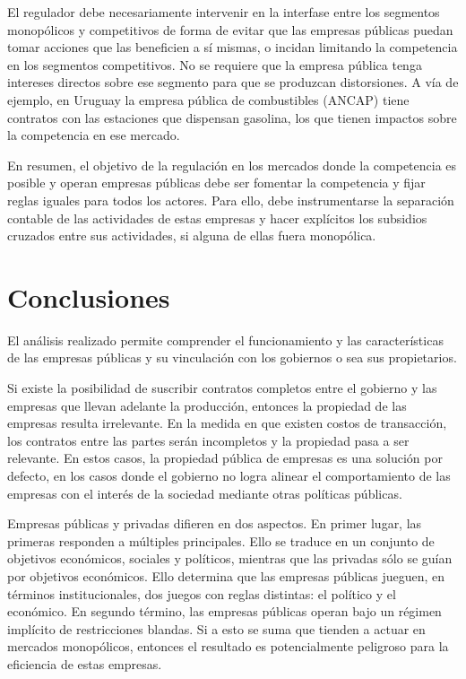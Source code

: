 \documentclass[
  12pt,
  spanish,
]{book}
\begin{document}
El regulador debe necesariamente intervenir en la interfase entre los segmentos monopólicos y competitivos de forma de evitar que las empresas públicas puedan tomar acciones que las beneficien a sí mismas, o incidan limitando la competencia en los segmentos competitivos. No se requiere que la empresa pública tenga intereses directos sobre ese segmento para que se produzcan distorsiones. A vía de ejemplo, en Uruguay la empresa pública de combustibles (ANCAP) tiene contratos con las estaciones que dispensan gasolina, los que tienen impactos sobre la competencia en ese mercado.

En resumen, el objetivo de la regulación en los mercados donde la competencia es posible y operan empresas públicas debe ser fomentar la competencia y fijar reglas iguales para todos los actores. Para ello, debe instrumentarse la separación contable de las actividades de estas empresas y hacer explícitos los subsidios cruzados entre sus actividades, si alguna de ellas fuera monopólica.

\hypertarget{conclusiones-2}{%
\section{Conclusiones}\label{conclusiones-2}}

El análisis realizado permite comprender el funcionamiento y las características de las empresas públicas y su vinculación con los gobiernos o sea sus propietarios.

Si existe la posibilidad de suscribir contratos completos entre el gobierno y las empresas que llevan adelante la producción, entonces la propiedad de las empresas resulta irrelevante. En la medida en que existen costos de transacción, los contratos entre las partes serán incompletos y la propiedad pasa a ser relevante. En estos casos, la propiedad pública de empresas es una solución por defecto, en los casos donde el gobierno no logra alinear el comportamiento de las empresas con el interés de la sociedad mediante otras políticas públicas.

Empresas públicas y privadas difieren en dos aspectos. En primer lugar, las primeras responden a múltiples principales. Ello se traduce en un conjunto de objetivos económicos, sociales y políticos, mientras que las privadas sólo se guían por objetivos económicos. Ello determina que las empresas públicas jueguen, en términos institucionales, dos juegos con reglas distintas: el político y el económico. En segundo término, las empresas públicas operan bajo un régimen implícito de restricciones blandas. Si a esto se suma que tienden a actuar en mercados monopólicos, entonces el resultado es potencialmente peligroso para la eficiencia de estas empresas.
\end{document}
